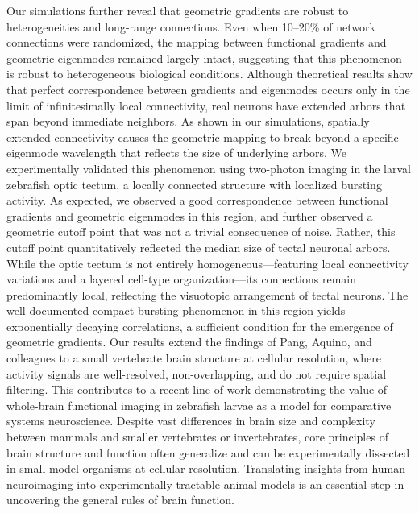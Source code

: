 \documentclass{article}
\begin{document}
Our simulations further reveal that geometric gradients are robust to heterogeneities and long-range connections. Even when 10–20\% of network connections were randomized, the mapping between functional gradients and geometric eigenmodes remained largely intact, suggesting that this phenomenon is robust to heterogeneous biological conditions. Although theoretical results show that perfect correspondence between gradients and eigenmodes occurs only in the limit of infinitesimally local connectivity\cite{GarcaTrillos2019}, real neurons have extended arbors that span beyond immediate neighbors. As shown in our simulations, spatially extended connectivity causes the geometric mapping to break beyond a specific eigenmode wavelength that reflects the size of underlying arbors. We experimentally validated this phenomenon using two-photon imaging in the larval zebrafish optic tectum, a locally connected structure with localized bursting activity\cite{avitan2017spontaneous}. As expected, we observed a good correspondence between functional gradients and geometric eigenmodes in this region, and further observed a geometric cutoff point that was not a trivial consequence of noise. Rather, this cutoff point quantitatively reflected the median size of tectal neuronal arbors. While the optic tectum is not entirely homogeneous---featuring local connectivity variations and a layered cell-type organization\cite{helmbrecht2018topography, shainer2025transcriptomic}---its connections remain predominantly local, reflecting the visuotopic arrangement of tectal neurons\cite{niell2005functional, li2022topographic}. The well-documented compact bursting phenomenon in this region yields exponentially decaying correlations\cite{zylbertal2023recurrent}, a sufficient condition for the emergence of geometric gradients. Our results extend the findings of Pang, Aquino, and colleagues\cite{pang2023geometric} to a small vertebrate brain structure at cellular resolution, where activity signals are well-resolved, non-overlapping, and do not require spatial filtering. This contributes to a recent line of work demonstrating the value of whole-brain functional imaging in zebrafish larvae as a model for comparative systems neuroscience\cite{legare2024structural}. Despite vast differences in brain size and complexity between mammals and smaller vertebrates or invertebrates, core principles of brain structure and function often generalize and can be experimentally dissected in small model organisms at cellular resolution\cite{ahrens2013whole, lin2022imaging}. Translating insights from human neuroimaging into experimentally tractable animal models is an essential step in uncovering the general rules of brain function.
\end{document}
